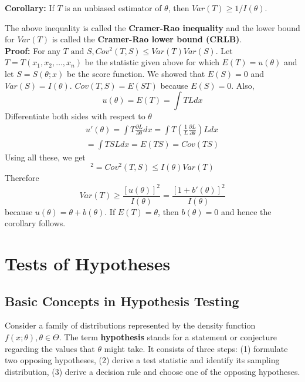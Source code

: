 \documentclass{article}
\begin{document}
\textbf{Corollary:} If \(T\) is an unbiased estimator of \(\theta\), then \(Var(T) \geq 1/I(\theta)\).

The above inequality is called the \textbf{Cramer-Rao inequality} and the lower bound for \(Var(T)\) is called the \textbf{Cramer-Rao lower bound (CRLB)}.\\


\textbf{Proof:} For any \(T \text{ and } S, Cov^2(T,S) \leq Var(T) Var(S)\). Let \(T=T(x_1,x_2,\dots,x_n)\) be the statistic given above for which \(E(T)=u(\theta)\) and let \(S=S(\theta;x)\) be the score function. We showed that \(E(S)=0\) and \(Var(S)=I(\theta)\). \(Cov(T,S)=E(ST)\) because \(E(S)=0\). Also,
\begin{equation*}
    u(\theta)=E(T)=\int TL dx
\end{equation*}
Differentiate both sides with respect to $\theta$
\begin{equation*}
    \begin{split}
        u'(\theta)=\int T \frac{\partial L}{\partial \theta} dx = \int T \left( \frac{1}{L} \frac{\partial L}{\partial \theta} \right) L dx\\
        = \int TSL dx = E(TS)= Cov(TS)
    \end{split}
\end{equation*}
Using all these, we get
\begin{equation*}
    [u'(\theta)]^2=Cov^2(T,S) \leq I(\theta) Var(T)
\end{equation*}
Therefore
\begin{equation*}
    Var(T) \geq \frac{[u(\theta)]^2}{I(\theta)}=\frac{[1+b'(\theta)]^2}{I(\theta)}
\end{equation*}
because \(u(\theta)=\theta+b(\theta)\). If \(E(T)=\theta\), then \(b(\theta)=0\) and hence the corollary follows.

\section{Tests of Hypotheses}

\subsection{Basic Concepts in Hypothesis Testing}

Consider a family of distributions represented by the density function \(f(x;\theta), \theta \in \Theta\). The term \textbf{hypothesis} stands for a statement or conjecture regarding the values that \(\theta\) might take. It consists of three steps: (1) formulate two opposing hypotheses, (2) derive a test statistic and identify its sampling distribution, (3) derive a decision rule and choose one of the opposing hypotheses.
\end{document}
